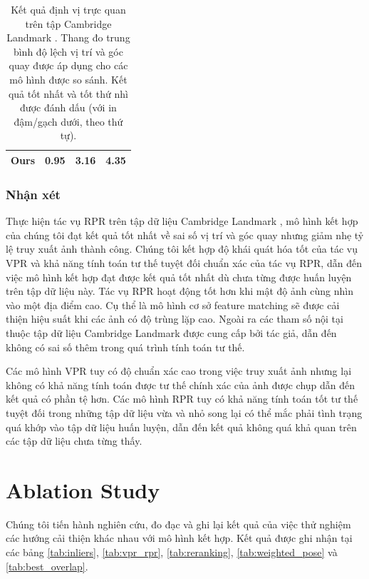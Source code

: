 \begin{table}
\begin{tabular}{|l|c|c|c|}
		Ours                                   & 0.95                                                                & \textbf{3.16}                                                            & \textbf{4.35}                                                                 \\ \hline
	\end{tabular}
	\vspace{10pt}
	\caption[Kết quả định vị trực quan trên tập Cambridge Landmark]{Kết quả định vị trực quan trên tập Cambridge Landmark \cite{kendall2016posenet}. Thang đo trung bình độ lệch vị trí và góc quay được áp dụng cho các mô hình được so sánh. Kết quả tốt nhất và tốt thứ nhì được đánh dấu (với in đậm/gạch dưới, theo thứ tự).}
	\label{tab:cambridge_vpr_comparison}
\end{table}
\egroup

\subsubsection*{Nhận xét}
Thực hiện tác vụ RPR trên tập dữ liệu Cambridge Landmark \cite{kendall2016posenet}, mô hình kết hợp của chúng tôi đạt kết quả tốt nhất về sai số vị trí và góc quay nhưng giảm nhẹ tỷ lệ truy xuất ảnh thành công. Chúng tôi kết hợp độ khái quát hóa tốt của tác vụ VPR và khả năng tính toán tư thế tuyệt đối chuẩn xác của tác vụ RPR, dẫn đến việc mô hình kết hợp đạt được kết quả tốt nhất dù chưa từng được huấn luyện trên tập dữ liệu này. Tác vụ RPR hoạt động tốt hơn khi mật độ ảnh cùng nhìn vào một địa điểm cao. Cụ thể là mô hình cơ sở feature matching sẽ được cải thiện hiệu suất khi các ảnh có độ trùng lặp cao. Ngoài ra các tham số nội tại thuộc tập dữ liệu Cambridge Landmark được cung cấp bởi tác giả, dẫn đến không có sai số thêm trong quá trình tính toán tư thế.

Các mô hình VPR tuy có độ chuẩn xác cao trong việc truy xuất ảnh nhưng lại không có khả năng tính toán được tư thế chính xác của ảnh được chụp dẫn đến kết quả có phần tệ hơn. Các mô hình RPR tuy có khả năng tính toán tốt tư thế tuyệt đối trong những tập dữ liệu vừa và nhỏ song lại có thể mắc phải tình trạng quá khớp vào tập dữ liệu huấn luyện, dẫn đến kết quả không quá khả quan trên các tập dữ liệu chưa từng thấy.

\section{Ablation Study}
Chúng tôi tiến hành nghiên cứu, đo đạc và ghi lại kết quả của việc thử nghiệm các hướng cải thiện khác nhau với mô hình kết hợp. Kết quả được ghi nhận tại các bảng \ref{tab:inliers}, \ref{tab:vpr_rpr}, \ref{tab:reranking}, \ref{tab:weighted_pose} và \ref{tab:best_overlap}.

